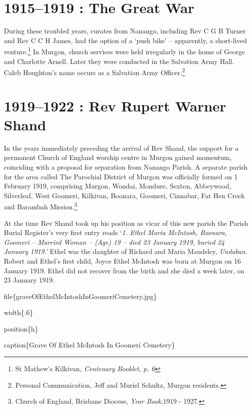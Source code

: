 \hypertarget{the-great-war}{%
\section{1915--1919 : The Great War}\label{the-great-war}}

During these troubled years, curates from Nanango, including Rev C G B
Turner and Rev C C H James\emph{,} had the option of a `push bike' --
apparently, a short-lived venture.\footnote{St Mathew's Kilkivan\emph{,
  Centenary Booklet, p. 6}} In Murgon, church services were held
irregularly in the home of George and Charlotte Arnell. Later they were
conducted in the Salvation Army Hall. Caleb Houghton's name occurs as a
Salvation Army Officer.\footnote{Personal Communication, Jeff and Muriel
  Schultz, Murgon residents.}

\hypertarget{rev-rupert-warner-shand}{%
\section{1919--1922 : Rev Rupert Warner
Shand}\label{rev-rupert-warner-shand}}

In the years immediately preceding the arrival of Rev Shand, the support
for a permanent Church of England worship centre in Murgon gained
momentum, coinciding with a proposal for separation from Nanango Parish.
A separate parish for the area called The Parochial District of Murgon
was officially formed on 1 February 1919, comprising Murgon, Wondai,
Mondure, Sexton, Abbeywood, Silverleaf, West Goomeri, Kilkivan, Boonara,
Goomeri, Cinnabar, Fat Hen Creek and Barambah Mission.\footnote{Church
  of England, Brisbane Diocese, \emph{Year Book,}1919 - 1927.}

At the time Rev Shand took up his position as vicar of this new parish
the Parish Burial Register's very first entry reads `\emph{1. Ethel
Maria McIntosh, Boonara, Goomeri -- Married Woman -- (Age) 19 -- died 23
January 1919, buried 24 January 1919.'} Ethel was the daughter of
Richard and Maria Maudsley, \emph{Undaban}. Robert and Ethel's first
child, Joyce Ethel McIntosh was born at Murgon on 16 January 1919. Ethel
did not recover from the birth and she died a week later, on 23 January
1919.

file\{graveOfEthelMcIntoshInGoomeriCemetery.jpg\}

width\{.6\}

position\{h\}

caption\{Grave Of Ethel McIntosh In Goomeri Cemetery\}


